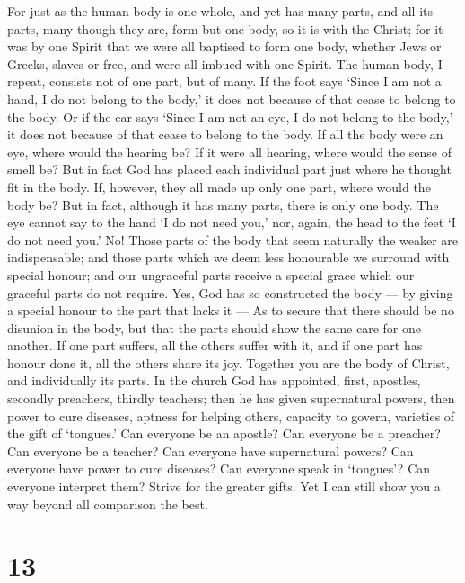  For just as the human body is one whole, and yet has many
parts, and all its parts, many though they are, form but one body, so it
is with the Christ;  for it was by one Spirit that we were
all baptised to form one body, whether Jews or Greeks, slaves or free,
and were all imbued with one Spirit.  The human body, I
repeat, consists not of one part, but of many.  If the foot
says `Since I am not a hand, I do not belong to the body,' it does not
because of that cease to belong to the body.  Or if the ear
says `Since I am not an eye, I do not belong to the body,' it does not
because of that cease to belong to the body.  If all the
body were an eye, where would the hearing be? If it were all hearing,
where would the sense of smell be?  But in fact God has
placed each individual part just where he thought fit in the body.
 If, however, they all made up only one part, where would
the body be?  But in fact, although it has many parts,
there is only one body.  The eye cannot say to the hand `I
do not need you,' nor, again, the head to the feet `I do not need you.'
 No! Those parts of the body that seem naturally the weaker
are indispensable;  and those parts which we deem less
honourable we surround with special honour; and our ungraceful parts
receive a special grace which our graceful parts do not require.
 Yes, God has so constructed the body --- by giving a
special honour to the part that lacks it ---  As to secure
that there should be no disunion in the body, but that the parts should
show the same care for one another.  If one part suffers,
all the others suffer with it, and if one part has honour done it, all
the others share its joy.  Together you are the body of
Christ, and individually its parts.  In the church God has
appointed, first, apostles, secondly preachers, thirdly teachers; then
he has given supernatural powers, then power to cure diseases, aptness
for helping others, capacity to govern, varieties of the gift of
`tongues.'  Can everyone be an apostle? Can everyone be a
preacher? Can everyone be a teacher? Can everyone have supernatural
powers?  Can everyone have power to cure diseases? Can
everyone speak in `tongues'? Can everyone interpret them? 
Strive for the greater gifts. Yet I can still show you a way beyond all
comparison the best.

\hypertarget{section-12}{%
\section{13}\label{section-12}}

